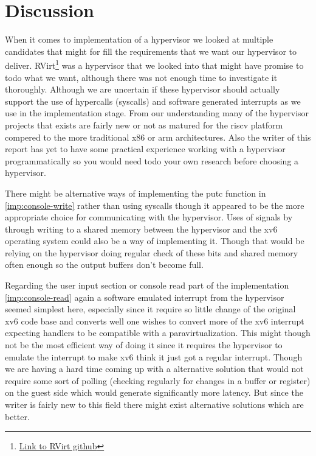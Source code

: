 \section{Discussion}
\label{discussion}

When it comes to implementation of a hypervisor we looked at multiple candidates that might for fill the requirements that we want our hypervisor to deliver. RVirt\footnote{ \href{https://github.com/mit-pdos/RVirt}{Link to RVirt github}} was a hypervisor that we looked into that might have promise to todo what we want, although there was not enough time to investigate it thoroughly. Although we are uncertain if these hypervisor should actually support the use of hypercalls (syscalls) and software generated interrupts as we use in the implementation stage. From our understanding many of the hypervisor projects that exists are fairly new or not as matured for the riscv platform compered to the more traditional x86 or arm architectures. Also the writer of this report has yet to have some practical experience working with a hypervisor programmatically so you would need todo your own research before choosing a hypervisor.

There might be alternative ways of implementing the putc function in \ref{imp:console-write} rather than using syscalls though it appeared to be the more appropriate choice for communicating with the hypervisor. Uses of signals by through writing to a shared memory between the hypervisor and the xv6 operating system could also be a way of implementing it. Though that would be relying on the hypervisor doing regular check of these bits and shared memory often enough so the output buffers don’t become full. 

Regarding the user input section or console read part of the implementation \ref{imp:console-read} again a software emulated interrupt from the hypervisor seemed simplest here, especially since it require so little change of the original xv6 code base and converts well one wishes to convert more of the xv6 interrupt expecting handlers to be compatible with a paravirtualization. This might though not be the most efficient way of doing it since it requires the hypervisor to emulate the interrupt to make xv6 think it just got a regular interrupt. Though we are having a hard time coming up with a alternative solution that would not require some sort of polling (checking regularly for changes in a buffer or register) on the guest side which would generate significantly more latency. But since the writer is fairly new to this field there might exist alternative solutions which are better.

